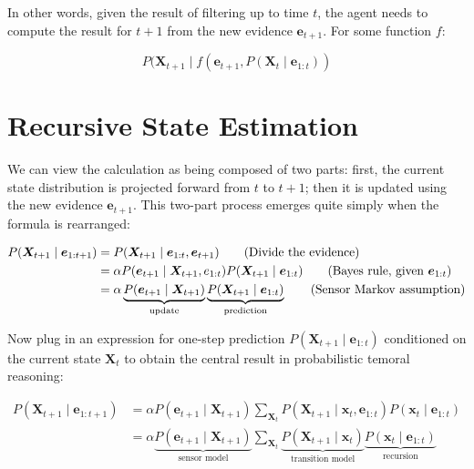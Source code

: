 \documentclass[11pt]{article}
\begin{document}
In other words, given the result of filtering up to time \(t\), the agent needs to compute the result for \(t + 1\) from the new evidence \(\bm{e}_{t+1}\).  For some function \(f\):

\begin{equation*}
P(\bm{X}_{t+1} \mid f \left( \bm{e}_{t+1}, P(\bm{X}_t \mid \bm{e}_{1:t}) \right)
\end{equation*}
\section{Recursive State Estimation}
\label{sec:orgb7aa51e}

We can view the calculation as being composed of two parts: first, the current state distribution is projected forward from \(t\) to \(t + 1\); then it is updated using the new evidence \(\bm{e}_{t+1}\). This two-part process emerges quite simply when the formula is rearranged:

\vspace{-.25in}
\begin{align*}
P(\bm{X}_{t+1} \mid \bm{e}_{1:t+1}) &= P(\bm{X}_{t+1} \mid \bm{e}_{1:t}, \bm{e}_{t+1}) \tag{Divide the evidence}\\
                                     &= \alpha P(\bm{e}_{t+1} \mid \bm{X}_{t+1}, e_{1:t}) P(\bm{X}_{t+1} \mid \bm{e}_{1:t}) \tag{Bayes rule, given $\bm{e}_{1:t}$}\\
                                     &= \alpha \underbrace{P(\bm{e}_{t+1} \mid \bm{X}_{t+1})}_{\text{update}} \underbrace{P(\bm{X}_{t+1} \mid \bm{e}_{1:t})}_{\text{prediction}} \tag{Sensor Markov assumption}
\end{align*}

Now plug in an expression for one-step prediction \(P(\bm{X}_{t+1} \mid \bm{e}_{1:t})\) conditioned on the current state \(\bm{X}_t\) to obtain the central result in probabilistic temoral reasoning:

\vspace{-.25in}
\begin{align*}
P(\bm{X}_{t+1} \mid \bm{e}_{1:t+1}) &= \alpha P(\bm{e}_{t+1} \mid \bm{X}_{t+1}) \sum_{\bm{X}_t} P(\bm{X}_{t+1} \mid \bm{x}_t, \bm{e}_{1:t}) P(\bm{x}_t \mid \bm{e}_{1:t}) \\
                                     &= \alpha \underbrace{P(\bm{e}_{t+1} \mid \bm{X}_{t+1})}_{\text{sensor model}} \sum_{\bm{X}_t} \underbrace{P(\bm{X}_{t+1} \mid \bm{x}_t)}_{\text{transition model}} \underbrace{P(\bm{x}_t \mid \bm{e}_{1:t})}_{\text{recursion}} \tag{14.5}
\end{align*}
\end{document}
